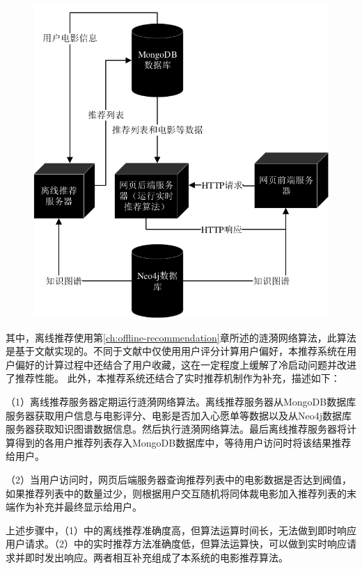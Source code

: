 \documentclass{bjfuthesis}
\begin{document}
\begin{figure}
	\includegraphics{figures/recommendation-procedure.pdf}
	\label{fig:recommendation-procedure}
\end{figure}

其中，离线推荐使用第\ref{ch:offline-recommendation}章所述的涟漪网络算法，此算法是基于文献\parencite{wang2018ripplenet}实现的。不同于文献\parencite{wang2018ripplenet}中仅使用用户评分计算用户偏好，本推荐系统在用户偏好的计算过程中还结合了用户收藏，这在一定程度上缓解了冷启动问题并改进了推荐性能。
此外，本推荐系统还结合了实时推荐机制作为补充，描述如下：

（1）离线推荐服务器定期运行涟漪网络算法。离线推荐服务器从MongoDB数据库服务器获取用户信息与电影评分、电影是否加入心愿单等数据以及从Neo4j数据库服务器获取知识图谱数据信息。然后执行涟漪网络算法。最后离线推荐服务器将计算得到的各用户推荐列表存入MongoDB数据库中，等待用户访问时将该结果推荐给用户。

（2）当用户访问时，网页后端服务器查询推荐列表中的电影数据是否达到阀值，如果推荐列表中的数量过少，则根据用户交互随机将同体裁电影加入推荐列表的末端作为补充并最终显示给用户。

上述步骤中，（1）中的离线推荐准确度高，但算法运算时间长，无法做到即时响应用户请求。（2）中的实时推荐方法准确度低，但算法运算快，可以做到实时响应请求并即时发出响应。两者相互补充组成了本系统的电影推荐算法。
\end{document}
